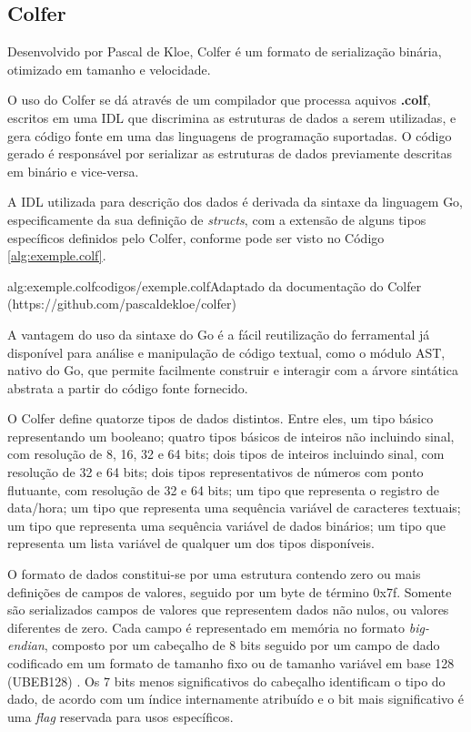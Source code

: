\subsection{Colfer}
\label{subsec:colfer}

Desenvolvido por Pascal de Kloe, Colfer é um formato de serialização binária, otimizado em tamanho e velocidade.

O uso do Colfer se dá através de um compilador que processa aquivos \textbf{.colf}, escritos em uma IDL que discrimina as estruturas de dados a serem utilizadas, e gera código fonte em uma das linguagens de programação suportadas. O código gerado é responsável por serializar as estruturas de dados previamente descritas em binário e vice-versa.

A IDL utilizada para descrição dos dados é derivada da sintaxe da linguagem Go, especificamente da sua definição de \textit{structs}, com a extensão de alguns tipos específicos definidos pelo Colfer, conforme pode ser visto no Código \ref{alg:exemple.colf}.

 {alg:exemple.colf}{codigos/exemple.colf}{Adaptado da documentação do Colfer (https://github.com/pascaldekloe/colfer)}

A vantagem do uso da sintaxe do Go é a fácil reutilização do ferramental já disponível para análise e manipulação de código textual, como o módulo AST, nativo do Go, que permite facilmente construir e interagir com a árvore sintática abstrata a partir do código fonte fornecido.

O Colfer define quatorze tipos de dados distintos. Entre eles, um tipo básico representando um booleano; quatro tipos básicos de inteiros não incluindo sinal, com resolução de 8, 16, 32 e 64 bits;
dois tipos de inteiros incluindo sinal, com resolução de 32 e 64 bits; dois tipos representativos de números com ponto flutuante, com resolução de 32 e 64 bits; 
um tipo que representa o registro de data/hora; um tipo que representa uma sequência variável de caracteres textuais; um tipo que representa uma sequência variável de dados binários; um tipo que representa um lista variável de qualquer um dos tipos disponíveis.

O formato de dados constitui-se por uma estrutura contendo zero ou mais definições de campos de valores, seguido por um byte de término 0x7f.
Somente são serializados campos de valores que representem dados não nulos, ou valores diferentes de zero.
Cada campo é representado em memória no formato \textit{big-endian}, composto por um cabeçalho de 8 bits seguido por um campo de dado codificado em um formato de tamanho fixo ou de tamanho variável em base 128 (UBEB128) \cite{wang2017experimental}. 
Os 7 bits menos significativos do cabeçalho identificam o tipo do dado, de acordo com um índice internamente atribuído e o bit mais significativo é uma \textit{flag} reservada para usos específicos.

